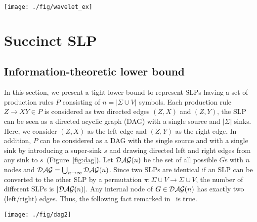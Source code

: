\documentclass[10pt]{llncs}
\begin{document}
\begin{figure*}[t]
\begin{center}
\texttt{[image: ./fig/wavelet\_ex]}
\end{center}
\vspace{-0.5cm}
\caption{Example of wavelet tree for a sequence $S=342112243$ over an alphabet $\{1,2,3,4\}$.}
\label{fig:wavelet_tree_ex}
\end{figure*}





\section{Succinct SLP}

\subsection{Information-theoretic lower bound}
In this section, we present a tight lower bound to represent SLPs
having a set of production rules $P$ consisting of $n=|\Sigma \cup V|$ symbols.
Each production rule $Z\to XY \in P$ is considered as two directed edges $(Z,X)$ and $(Z,Y)$, 
the SLP can be seen as a directed acyclic graph (DAG) with a single source and $|\Sigma|$ sinks.
Here, we consider $(Z,X)$ as the left edge and $(Z,Y)$ as the right edge.
In addition, $P$ can be considered as a DAG with the single source and 
with a single sink 
by introducing a super-sink $s$ and drawing directed left and right edges from any sink to $s$~(Figure~\ref{fig:dag}). 
Let ${\cal DAG}(n)$ be the set of all possible $G$s with $n$ nodes and 
${\cal DAG}=\bigcup_{n\to\infty}{\cal DAG}(n)$. 
Since two SLPs are identical if an SLP can be converted to the other SLP by 
a permutation $\pi : \Sigma \cup V \rightarrow \Sigma \cup V$,
the number of different SLPs is $|{\cal DAG}(n)|$.
Any internal node of $G \in {\cal DAG}(n)$ has exactly two (left/right) edges.
Thus, the following fact remarked in~\cite{Maruyama2011} is true.

\begin{figure*}[t]
\begin{center}
\texttt{[image: ./fig/dag2]}
\end{center}
\vspace{-0.7cm}
\caption{Example of DAG representation of an SLP and its spanning tree decomposition. 
An SLP is represented by a DAG $G$. $G$ is decomposed into the left tree $T_L$ and right tree $T_R$.}
\label{fig:dag}
\end{figure*}
\end{document}
